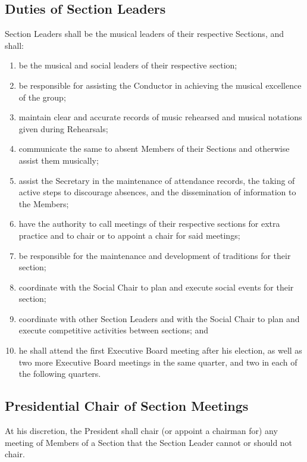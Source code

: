 \documentclass{article}
\begin{document}
\subsection{Duties of Section Leaders}

Section Leaders shall be the musical leaders of their respective Sections,
and shall:
\begin{enumerate}
\item be the musical and social leaders of their respective section;
\item be responsible for assisting the Conductor in achieving the musical
excellence of the group;
\item maintain clear and accurate records of music rehearsed and musical
notations given during Rehearsals;
\item communicate the same to absent Members of their Sections and otherwise
assist them musically;
\item assist the Secretary in the maintenance of attendance records, the
taking of active steps to discourage absences, and the dissemination
of information to the Members;
\item have the authority to call meetings of their respective sections for
extra practice and to chair or to appoint a chair for said meetings;
\item be responsible for the maintenance and development of traditions for
their section;
\item coordinate with the Social Chair to plan and execute social events
for their section;
\item coordinate with other Section Leaders and with the Social Chair to
plan and execute competitive activities between sections; and
\item he shall attend the first Executive Board meeting after his election,
as well as two more Executive Board meetings in the same quarter,
and two in each of the following quarters.
\end{enumerate}

\subsection{Presidential Chair of Section Meetings}

At his discretion, the President shall chair (or appoint a chairman
for) any meeting of Members of a Section that the Section Leader cannot
or should not chair.
\end{document}
